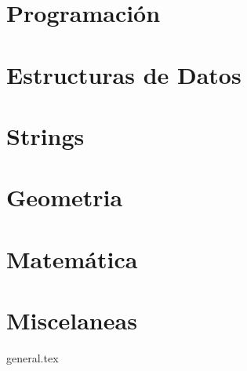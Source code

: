 \documentclass{article}
\begin{document}
\tableofcontents

\pagebreak

\section{Programación}

\pagebreak

\pagebreak

\section{Estructuras de Datos}

\pagebreak

\section{Strings}

\pagebreak

\section{Geometria}

\pagebreak

\section{Matemática}

\pagebreak

\pagebreak

\pagebreak
%

\section{Miscelaneas}
{general.tex}
\pagebreak
\end{document}
